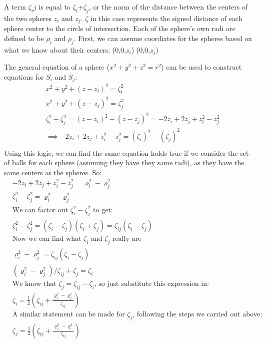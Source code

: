 \documentclass{article}
\begin{document}
A term $\zeta_ij$ is equal to  $\zeta_i$+$\zeta_j$, or the norm of the distance between the centers of the two spheres $z_i$ and $z_j$. $\zeta$ in this case represents the signed distance of each sphere center to the circle of intersection. Each of the sphere's own radi are defined to be $\rho_i$ and $\rho_j$. First, we can assume coordiates for the spheres based on what we know about their centers:
(0,0,$z_i$)  (0,0,$z_j$)


The general equation of a sphere ($x^2 + y^2 +z^2 = r^2$) can be used to construct equations for $S_i$ and $S_j$:
\begin{align*}
&x^2 + y^2 +(z-z_i)^2 = \zeta_i^2 \\
&x^2 + y^2 +(z-z_j)^2 = \zeta_j^2 \\
&\zeta_i^2-\zeta_j^2 =(z-z_i)^2-(z-z_j)^2=-2z_i +2z_j +z_i^2 - z_j^2\\
& \implies -2z_i +2z_j +z_i^2 - z_j^2 = (\zeta_i)^2-(\zeta_j)^2\\
\end{align*}
Using this logic, we can find the same equation holds true if we consider the set of balls for each sphere (assuming they have they same radi), as they have the same centers as the spheres. So:
\begin{align*}
&-2z_i +2z_j +z_i^2 - z_j^2 = \varrho_i^2-\varrho_j^2 \\
&\zeta_i^2-\zeta_j^2 = \varrho_i^2-\varrho_j^2\\
&\text{We can factor out $\zeta_i^2-\zeta_j^2$ to get:} \\
&\zeta_i^2-\zeta_j^2 =(\zeta_i-\zeta_j)(\zeta_i+\zeta_j) = \zeta_{ij}(\zeta_i-\zeta_j) \\
&\text{Now we can find what $\zeta_i$ and $\zeta_j$ really are} \\
&\varrho_i^2 - \varrho_j^2  = \zeta_{ij}(\zeta_i-\zeta_j) \\
&(\varrho_i^2 - \varrho_j^2)/\zeta_{ij} + \zeta_j = \zeta_i \\
&\text{We know that $\zeta_j = \zeta_{ij} - \zeta_i$, so just substitute this expression in:} \\
&\zeta_i = \frac{1}{2}\left(\zeta_{ij}+\frac{\varrho_i^2-\varrho_j^2}{\zeta_{ij}}\right) \\
&\text{A similar statement can be made for $\zeta_j$, following the steps we carried out above:} \\
&\zeta_j = \frac{1}{2}\left(\zeta_{ij}+\frac{\varrho_j^2-\varrho_i^2}{\zeta_{ij}}\right)
\end{align*}
\end{document}
